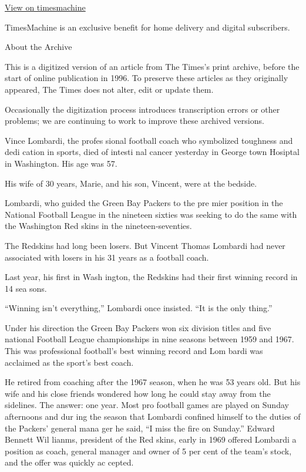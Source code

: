 \href{http://timesmachine.nytimes3xbfgragh.onion/timesmachine/1970/09/04/355790322.html}{View
on timesmachine}

TimesMachine is an exclusive benefit for home delivery and digital
subscribers.

About the Archive

This is a digitized version of an article from The Times's print
archive, before the start of online publication in 1996. To preserve
these articles as they originally appeared, The Times does not alter,
edit or update them.

Occasionally the digitization process introduces transcription errors or
other problems; we are continuing to work to improve these archived
versions.

Vince Lombardi, the profes sional football coach who symbolized
toughness and dedi cation in sports, died of intesti nal cancer
yesterday in George town Hosiptal in Washington. His age was 57.

His wife of 30 years, Marie, and his son, Vincent, were at the bedside.

Lombardi, who guided the Green Bay Packers to the pre mier position in
the National Football League in the nineteen sixties was seeking to do
the same with the Washington Red skins in the nineteen‐seventies.

The Redskins had long been losers. But Vincent Thomas Lombardi had never
associated with losers in his 31 years as a football coach.

Last year, his first in Wash ington, the Redskins had their first
winning record in 14 sea sons.

``Winning isn't everything,'' Lombardi once insisted. ``It is the only
thing.''

Under his direction the Green Bay Packers won six division titles and
five national Football League championships in nine seasons between 1959
and 1967. This was professional football's best winning record and Lom
bardi was acclaimed as the sport's best coach.

He retired from coaching after the 1967 season, when he was 53 years
old. But his wife and his close friends wondered how long he could stay
away from the sidelines. The answer: one year. Most pro football games
are played on Sunday afternoons and dur ing the season that Lombardi
confined himself to the duties of the Packers' general mana ger he said,
``I miss the fire on Sunday.'' Edward Bennett Wil lianms, president of
the Red skins, early in 1969 offered Lombardi a position as coach,
general manager and owner of 5 per cent of the team's stock, and the
offer was quickly ac cepted.

